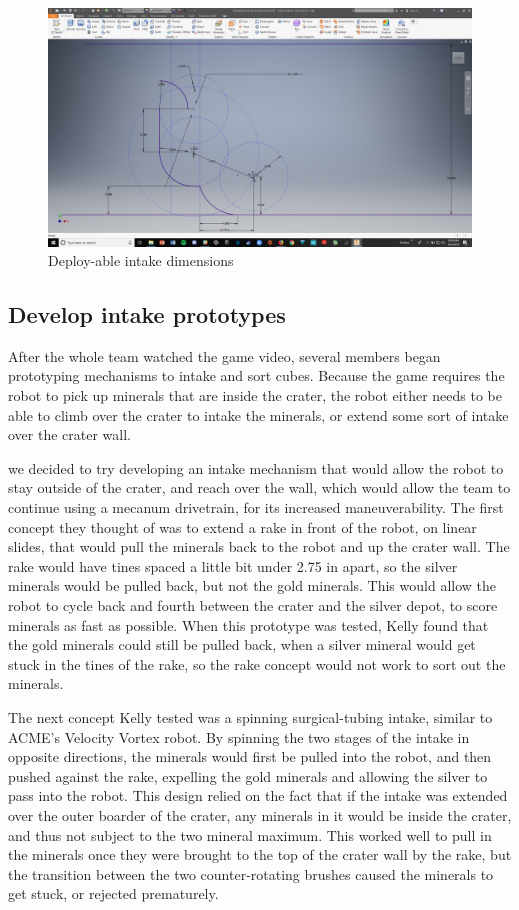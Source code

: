 \documentclass{article}
\newif\ifcontents
\begin{document}
\contentsfalse

\begin{figure}
    \centering
    \includegraphics[width=.6\textwidth]{02_09-10/images/intakesketch.png}
    \caption{Deploy-able intake dimensions}
    \label{fig:intake}
\end{figure}

\subsection{Develop intake prototypes}
After the whole team watched the game video, several members began prototyping mechanisms to intake and sort cubes. Because the game requires the robot to pick up minerals that are inside the crater, the robot either needs to be able to climb over the crater to intake the minerals, or extend some sort of intake over the crater wall. 

we decided to try developing an intake mechanism that would allow the robot to stay outside of the crater, and reach over the wall, which would allow the team to continue using a mecanum drivetrain, for its increased maneuverability. The first concept they thought of was to extend a rake in front of the robot, on linear slides, that would pull the minerals back to the robot and up the crater wall. The rake would have tines spaced a little bit under 2.75 in apart, so the silver minerals would be pulled back, but not the gold minerals. This would allow the robot to cycle back and fourth between the crater and the silver depot, to score minerals as fast as possible. When this prototype was tested, Kelly found that the gold minerals could still be pulled back, when a silver mineral would get stuck in the tines of the rake, so the rake concept would not work to sort out the minerals. 

The next concept Kelly tested was a spinning surgical-tubing intake, similar to ACME's Velocity Vortex robot. By spinning the two stages of the intake in opposite directions, the minerals would first be pulled into the robot, and then pushed against the rake, expelling the gold minerals and allowing the silver to pass into the robot. This design relied on the fact that if the intake was extended over the outer boarder of the crater, any minerals in it would be inside the crater, and thus not subject to the two mineral maximum. This worked well to pull in the minerals once they were brought to the top of the crater wall by the rake, but the transition between the two counter-rotating brushes caused the minerals to get stuck, or rejected prematurely. 
\end{document}
